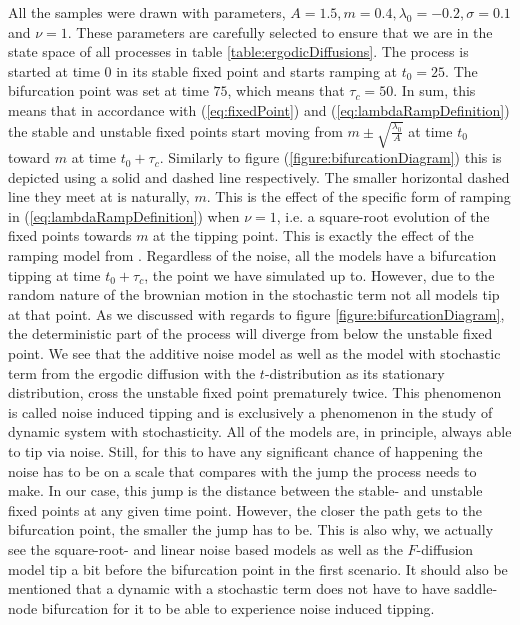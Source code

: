 All the samples were drawn with parameters, $A = 1.5, m = 0.4, \lambda_0 = -0.2, \sigma = 0.1$ and $\nu = 1$. These parameters are carefully selected to ensure that we are in the state space of all processes in table \ref{table:ergodicDiffusions}. The process is started at time $0$ in its stable fixed point and starts ramping at $t_0 = 25$. The bifurcation point was set at time $75$, which means that $\tau_c = 50$. In sum, this means that in accordance with (\ref{eq:fixedPoint}) and (\ref{eq:lambdaRampDefinition}) the stable and unstable fixed points start moving from $m\pm\sqrt{\frac{\lambda_0}{A}}$ at time $t_0$ toward $m$ at time $t_0 + \tau_c$. Similarly to figure (\ref{figure:bifurcationDiagram}) this is depicted using a solid and dashed line respectively. The smaller horizontal dashed line they meet at is naturally, $m$. This is the effect of the specific form of ramping in (\ref{eq:lambdaRampDefinition}) when $\nu = 1$, i.e. a square-root evolution of the fixed points towards $m$ at the tipping point. This is exactly the effect of the ramping model from \cite{Ditlevsen2023}. Regardless of the noise, all the models have a bifurcation tipping at time $t_0+\tau_c$, the point we have simulated up to. However, due to the random nature of the brownian motion in the stochastic term not all models tip at that point. As we discussed with regards to figure \ref{figure:bifurcationDiagram}, the deterministic part of the process will diverge from below the unstable fixed point. We see that the additive noise model as well as the model with stochastic term from the ergodic diffusion with the $t$-distribution as its stationary distribution, cross the unstable fixed point prematurely twice. This phenomenon is called noise induced tipping and is exclusively a phenomenon in the study of dynamic system with stochasticity. All of the models are, in principle, always able to tip via noise. Still, for this to have any significant chance of happening the noise has to be on a scale that compares with the jump the process needs to make. In our case, this jump is the distance between the stable- and unstable fixed points at any given time point. However, the closer the path gets to the bifurcation point, the smaller the jump has to be. This is also why, we actually see the square-root- and linear noise based models as well as the $F$-diffusion model tip a bit before the bifurcation point in the first scenario. It should also be mentioned that a dynamic with a stochastic term does not have to have saddle-node bifurcation for it to be able to experience noise induced tipping.\\\\
